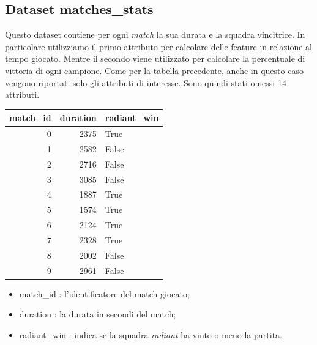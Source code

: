 \documentclass[a4paper,12pt,openany,oneside]{book}
\begin{document}
\subsection{Dataset matches\_stats}
Questo dataset contiene per ogni \textit{match} la sua durata e la squadra vincitrice. In particolare utilizziamo il primo attributo per calcolare delle feature in relazione al tempo giocato. Mentre il secondo viene utilizzato per calcolare la percentuale di vittoria di ogni campione. Come per la tabella precedente, anche in questo caso vengono riportati solo gli attributi di interesse. Sono quindi stati omessi 14 attributi.
\begin{table}[ht]
	\scriptsize	
	\centering	
	\begin{tabularx}{0.3\textwidth}{rrl}
		match\_id & duration & radiant\_win \\
		\midrule
		0 &     2375 &        True \\
		1 &     2582 &       False \\
		2 &     2716 &       False \\
		3 &     3085 &       False \\
		4 &     1887 &        True \\
		5 &     1574 &        True \\
		6 &     2124 &        True \\
		7 &     2328 &        True \\
		8 &     2002 &       False \\
		9 &     2961 &       False \\
	\end{tabularx}	
	\label{table:matches_stats}
\end{table}
\begin{itemize}
	\item match\_id : l'identificatore del match giocato;
	\item duration : la durata in secondi del match;
	\item radiant\_win : indica se la squadra \textit{radiant} ha vinto o meno la partita.
\end{itemize}
\end{document}
